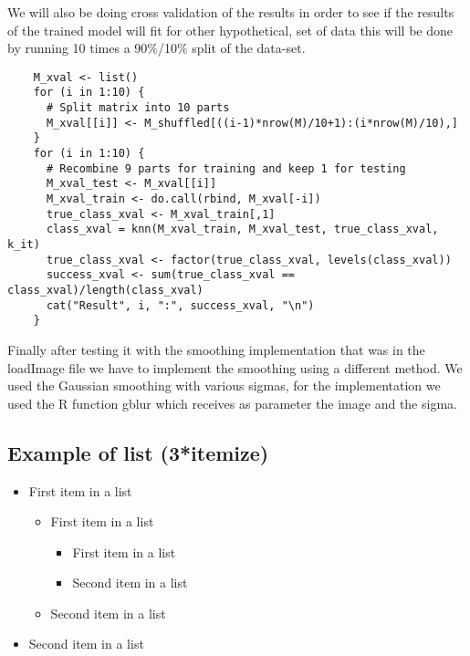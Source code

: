 \documentclass[paper=a4, fontsize=11pt]{scrartcl} %
\numberwithin{equation}{section} %
\numberwithin{figure}{section} %
\numberwithin{table}{section} %
\begin{document}
\begin{flushleft}
We will also be doing cross validation of the results in order to see if the results of the trained model will fit for other hypothetical, set of data this will be done by running 10 times a 90\%/10\% split of the data-set.  
\end{flushleft}
\begin{lstlisting}
    M_xval <- list()
    for (i in 1:10) {
      # Split matrix into 10 parts
      M_xval[[i]] <- M_shuffled[((i-1)*nrow(M)/10+1):(i*nrow(M)/10),]
    }
    for (i in 1:10) {
      # Recombine 9 parts for training and keep 1 for testing
      M_xval_test <- M_xval[[i]]
      M_xval_train <- do.call(rbind, M_xval[-i])
      true_class_xval <- M_xval_train[,1]
      class_xval = knn(M_xval_train, M_xval_test, true_class_xval, k_it)
      true_class_xval <- factor(true_class_xval, levels(class_xval))
      success_xval <- sum(true_class_xval == class_xval)/length(class_xval)
      cat("Result", i, ":", success_xval, "\n")
    }
\end{lstlisting}

\begin{flushleft}
Finally after testing it with the smoothing implementation that was in the loadImage file we have to implement the smoothing using a different method. We used the Gaussian smoothing with various sigmas, for the implementation we used the R function gblur which receives as parameter the image and the sigma.   
\end{flushleft}

\subsection{Example of list (3*itemize)}
\begin{itemize}
	\item First item in a list 
		\begin{itemize}
		\item First item in a list 
			\begin{itemize}
			\item First item in a list 
			\item Second item in a list 
			\end{itemize}
		\item Second item in a list 
		\end{itemize}
	\item Second item in a list 
\end{itemize}
\end{document}

